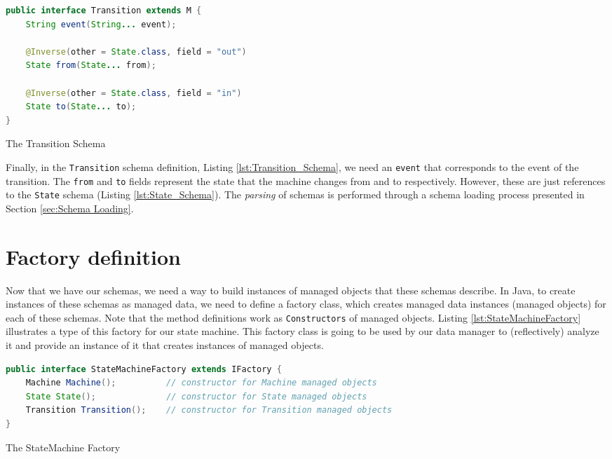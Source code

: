 \begin{sourcecode}[H]
	\begin{lstlisting}[language=Java,escapechar=|]
public interface Transition extends M {
	String event(String... event);

	@Inverse(other = State.class, field = "out")
	State from(State... from);

	@Inverse(other = State.class, field = "in")
	State to(State... to);
}
	\end{lstlisting}
	\caption{The Transition Schema}
	\label{lst:Transition_Schema}
\end{sourcecode}

Finally, in the \texttt{Transition} schema definition, Listing \ref{lst:Transition_Schema}, we need an \texttt{event} that corresponds to the event of the transition.
The \texttt{from} and \texttt{to} fields represent the state that the machine changes from and to respectively.
However, these are just references to the \texttt{State} schema (Listing \ref{lst:State_Schema}).
The \textit{parsing} of schemas is performed through a schema loading process presented in Section \ref{sec:Schema Loading}.

\section{Factory definition}
Now that we have our schemas, we need a way to build instances of managed objects that these schemas describe. 
In Java, to create instances of these schemas as managed data, we need to define a factory class, which creates managed data instances (managed objects) for each of these schemas.
Note that the method definitions work as \texttt{Constructors} of managed objects.
Listing \ref{lst:StateMachineFactory} illustrates a type of this factory for our state machine.
This factory class is going to be used by our data manager to (reflectively) analyze it and provide an instance of it that creates instances of managed objects.

\begin{sourcecode}[H]
	\begin{lstlisting}[language=Java,escapechar=|]
public interface StateMachineFactory extends IFactory {
	Machine Machine();  		// constructor for Machine managed objects
	State State(); 				// constructor for State managed objects
	Transition Transition(); 	// constructor for Transition managed objects
}
	\end{lstlisting}
	\caption{The StateMachine Factory}
	\label{lst:StateMachineFactory}
\end{sourcecode}

